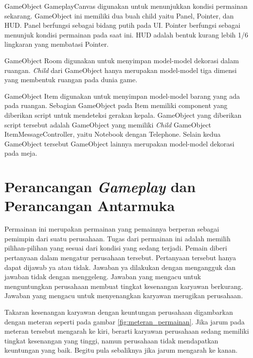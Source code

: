 GameObject GameplayCanvas digunakan untuk menunjukkan kondisi permainan sekarang. GameObject ini memiliki dua buah child yaitu Panel, Pointer, dan HUD. Panel berfungsi sebagai bidang putih pada UI. Pointer berfungsi sebagai menunjuk kondisi permainan pada saat ini. HUD adalah bentuk kurang lebih 1/6 lingkaran yang membatasi Pointer. 

GameObject Room digunakan untuk menyimpan model-model dekorasi dalam ruangan. \textit{Child} dari GameObject hanya merupakan model-model tiga dimensi yang membentuk ruangan pada dunia game.

GameObject Item digunakan untuk menyimpan model-model barang yang ada pada ruangan. Sebagian GameObject pada Item memiliki component yang diberikan script untuk mendeteksi gerakan kepala. GameObject yang diberikan script tersebut adalah GameObject yang memiliki \textit{Child} GameObject ItemMessageController, yaitu Notebook dengan Telephone. Selain kedua GameObject tersebut GameObject lainnya merupakan model-model dekorasi pada meja.

\section{Perancangan \textit{Gameplay} dan Perancangan Antarmuka}
\label{sec:perancangan_gameplay}

Permainan ini merupakan permainan yang pemainnya berperan sebagai pemimpin dari suatu perusahaan. Tugas dari permainan ini adalah memilih pilihan-pilihan yang sesuai dari kondisi yang sedang terjadi. Pemain diberi pertanyaan dalam mengatur perusahaan tersebut. Pertanyaan tersebut hanya dapat dijawab ya atau tidak. Jawaban ya dilakukan dengan mengangguk dan jawaban tidak dengan menggeleng. Jawaban yang mengacu untuk menguntungkan perusahaan membuat tingkat kesenangan karyawan berkurang. Jawaban yang mengacu untuk menyenangkan karyawan merugikan perusahaan.

Takaran kesenangan karyawan dengan keuntungan perusahaan digambarkan dengan meteran seperti pada gambar \ref{fig:meteran_permainan}. Jika jarum pada meteran tersebut mengarah ke kiri, berarti karyawan perusahaan sedang memiliki tingkat kesenangan yang tinggi, namun perusahaan tidak mendapatkan keuntungan yang baik. Begitu pula sebaliknya jika jarum mengarah ke kanan. 

